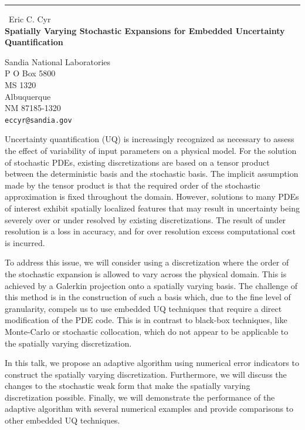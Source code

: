 \documentclass{report}
\begin{document}
\begin{center}
\rule{6in}{1pt} \
{\large Eric C. Cyr \\
{\bf Spatially Varying Stochastic Expansions for Embedded Uncertainty Quantification}}

Sandia National Laboratories \\ P O Box 5800 \\ MS 1320 \\ Albuquerque \\ NM 87185-1320
\\
{\tt eccyr@sandia.gov}\end{center}

Uncertainty quantification (UQ) is increasingly recognized as necessary to assess
the effect of variability of input parameters on a physical model. For the solution
of stochastic PDEs, existing discretizations are based on a tensor product between
the deterministic basis and the stochastic basis. The implicit assumption
made by the tensor product is that the required order of the stochastic approximation
is fixed throughout the domain. However, solutions to many
PDEs of interest exhibit spatially localized features that may result in
uncertainty being severely over or under resolved by existing discretizations.
The result of under resolution is a loss in accuracy, and for over
resolution excess computational cost is incurred.

To address this issue, we will consider using a discretization where the order
of the stochastic expansion is allowed to vary across the physical
domain. This is achieved by a Galerkin projection onto a spatially varying
basis. The challenge of this method is in the construction of such a basis which,
due to the fine level of granularity, compels us to use
embedded UQ techniques that require a direct modification of the PDE code.
This is in contrast to black-box techniques, like Monte-Carlo or stochastic collocation,
which do not appear to be applicable to the spatially varying discretization.

In this talk, we propose an adaptive algorithm using numerical error indicators
to construct the spatially varying discretization.
Furthermore, we will discuss the changes to the stochastic weak form that make
the spatially varying discretization possible. Finally, we will demonstrate the
performance of the adaptive algorithm with several numerical
examples and provide comparisons to other embedded UQ techniques.
\end{document}
